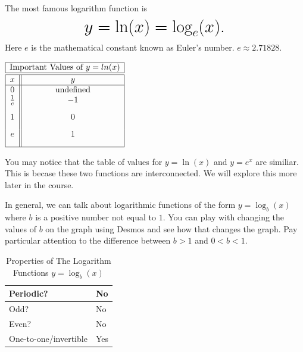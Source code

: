 \documentclass[nooutcomes]{ximera}
\begin{document}
\begin{example}
The most famous logarithm function is
 $$ \mbox{\huge $y=\ln(x)=\log_{e}(x)$.}$$ 
Here $e$ is the mathematical constant known as Euler's number. $e \approx 2.71828$.

\begin{image}
\end{image}

\begin{center}
\(
\begin{array}{ |c || c|  }
 \hline
 \multicolumn{2}{|c|}{\text{\normalfont Important Values of } y=ln(x)} \\
\hline
 \hline
 x & y\\
 \hline
0&\text{\normalfont undefined}\\ 
\frac{1}{e}&-1\\ [2ex]
1&0\\[2ex]
 e&1\\[2ex]
 \hline
\end{array}
\)
\end{center}

\end{example}

You may notice that the table of values for $y=\ln(x)$ and $y=e^x$ are similiar.  This is becase these two functions are interconnected.  We will explore this more later in the course.

In general, we can talk about logarithmic functions of the form $y=\log_b(x)$ where $b$ is a positive number not equal to $1$.  You can play with changing the values of $b$ on the graph using Desmos and see how that changes the graph.  Pay particular attention to the difference between $b>1$ and $0<b<1$.

\begin{center}  
\end{center}

\begin{table}[h]
\caption{\label{tab:logproperties}Properties of The Logarithm Functions $y = \log_b(x)$}
\centering
\begin{tabular}{l|l}
Periodic? & No\\ \hline
Odd? &  No \\ \hline
Even? & No \\ \hline
One-to-one/invertible & Yes
\end{tabular}
\end{table}
\end{document}
